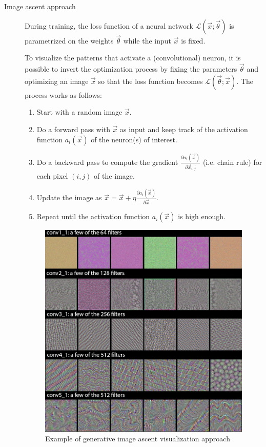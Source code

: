\begin{description}
    \item[Image ascent approach] 
        During training, the loss function of a neural network $\mathcal{L}(\vec{x}; \vec{\theta})$ is 
        parametrized on the weights $\vec{\theta}$ while the input $\vec{x}$ is fixed.
        
        To visualize the patterns that activate a (convolutional) neuron, it is possible to invert the optimization process
        by fixing the parameters $\vec{\theta}$ and optimizing an image $\vec{x}$ so that the loss function becomes $\mathcal{L}(\vec{\theta}; \vec{x})$.
        The process works as follows:
        \begin{enumerate}
            \item Start with a random image $\vec{x}$.
            \item Do a forward pass with $\vec{x}$ as input and keep track of the activation function $a_i(\vec{x})$ of the neuron(s) of interest.
            \item Do a backward pass to compute the gradient $\frac{\partial a_i(\vec{x})}{\partial \vec{x}_{i,j}}$ (i.e. chain rule) for each pixel $(i, j)$ of the image.
            \item Update the image as $\vec{x} = \vec{x} + \eta \frac{\partial a_i(\vec{x})}{\partial \vec{x}}$.
            \item Repeat until the activation function $a_i(\vec{x})$ is high enough.
        \end{enumerate}

        \begin{figure}[H]
            \centering
            \includegraphics[width=0.5\linewidth]{./img/cnn_visualization_ascent.png}
            \caption{Example of generative image ascent visualization approach}
        \end{figure}


\end{description}
